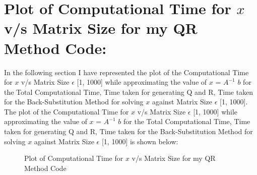 \documentclass[12pt,a4paper]{article}
\begin{document}
\section{Plot of Computational Time for $x$ v/s Matrix Size for my QR Method Code:}
In the following section I have represented the plot of the Computational Time for $x$ v/s Matrix Size  $\epsilon$ [1, 1000] while approximating the value of $x$ = $A^{-1}$ $b$ for the Total Computational Time, Time taken for generating Q and R, Time taken for the  Back-Substitution Method for solving $x$ against Matrix Size  $\epsilon$ [1, 1000]. The plot of the Computational Time for $x$ v/s Matrix Size  $\epsilon$ [1, 1000] while approximating the value of $x$ = $A^{-1}$ $b$ for the Total Computational Time, Time taken for generating Q and R, Time taken for the  Back-Substitution Method for solving $x$ against Matrix Size  $\epsilon$ [1, 1000] is shown below:
\clearpage
\begin{figure}[!ht]
	\begin{center}
	\end{center}
	\caption{Plot of Computational Time for $x$ v/s Matrix Size for my QR Method Code}
\end{figure}
\end{document}
